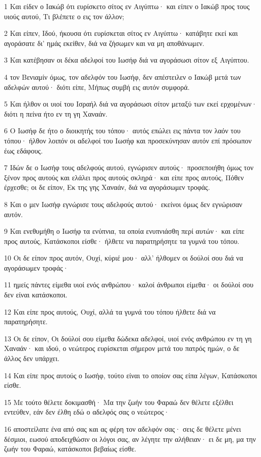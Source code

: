 \par 1 Και είδεν ο Ιακώβ ότι ευρίσκετο σίτος εν Αιγύπτω· και είπεν ο Ιακώβ προς τους υιούς αυτού, Τι βλέπετε ο εις τον άλλον;
\par 2 Και είπεν, Ιδού, ήκουσα ότι ευρίσκεται σίτος εν Αιγύπτω· κατάβητε εκεί και αγοράσατε δι' ημάς εκείθεν, διά να ζήσωμεν και να μη αποθάνωμεν.
\par 3 Και κατέβησαν οι δέκα αδελφοί του Ιωσήφ διά να αγοράσωσι σίτον εξ Αιγύπτου.
\par 4 τον Βενιαμίν όμως, τον αδελφόν του Ιωσήφ, δεν απέστειλεν ο Ιακώβ μετά των αδελφών αυτού· διότι είπε, Μήπως συμβή εις αυτόν συμφορά.
\par 5 Και ήλθον οι υιοί του Ισραήλ διά να αγοράσωσι σίτον μεταξύ των εκεί ερχομένων· διότι η πείνα ήτο εν τη γη Χαναάν.
\par 6 Ο Ιωσήφ δε ήτο ο διοικητής του τόπου· αυτός επώλει εις πάντα τον λαόν του τόπου· ήλθον λοιπόν οι αδελφοί του Ιωσήφ και προσεκύνησαν αυτόν επί πρόσωπον έως εδάφους.
\par 7 Ιδών δε ο Ιωσήφ τους αδελφούς αυτού, εγνώρισεν αυτούς· προσεποιήθη όμως τον ξένον προς αυτούς και ελάλει προς αυτούς σκληρά· και είπε προς αυτούς, Πόθεν έρχεσθε; οι δε είπον, Εκ της γης Χαναάν, διά να αγοράσωμεν τροφάς.
\par 8 Και ο μεν Ιωσήφ εγνώρισε τους αδελφούς αυτού· εκείνοι όμως δεν εγνώρισαν αυτόν.
\par 9 Και ενεθυμήθη ο Ιωσήφ τα ενύπνια, τα οποία ενυπνιάσθη περί αυτών· και είπε προς αυτούς, Κατάσκοποι είσθε· ήλθετε να παρατηρήσητε τα γυμνά του τόπου.
\par 10 Οι δε είπον προς αυτόν, Ουχί, κύριέ μου· αλλ' ήλθομεν οι δούλοί σου διά να αγοράσωμεν τροφάς·
\par 11 ημείς πάντες είμεθα υιοί ενός ανθρώπου· καλοί άνθρωποι είμεθα· οι δούλοί σου δεν είναι κατάσκοποι.
\par 12 Και είπε προς αυτούς, Ουχί, αλλά τα γυμνά του τόπου ήλθετε διά να παρατηρήσητε.
\par 13 Οι δε είπον, Οι δούλοί σου είμεθα δώδεκα αδελφοί, υιοί ενός ανθρώπου εν τη γη Χαναάν· και ιδού, ο νεώτερος ευρίσκεται σήμερον μετά του πατρός ημών, ο δε άλλος δεν υπάρχει.
\par 14 Και είπε προς αυτούς ο Ιωσήφ, τούτο είναι το οποίον σας είπα λέγων, Κατάσκοποι είσθε.
\par 15 Με τούτο θέλετε δοκιμασθή· Μα την ζωήν του Φαραώ δεν θέλετε εξέλθει εντεύθεν, εάν δεν έλθη εδώ ο αδελφός σας ο νεώτερος·
\par 16 αποστείλατε ένα από σας και ας φέρη τον αδελφόν σας· σεις δε θέλετε μένει δέσμιοι, εωσού αποδειχθώσιν οι λόγοι σας, αν λέγητε την αλήθειαν· ει δε μη, μα την ζωήν του Φαραώ, κατάσκοποι βεβαίως είσθε.
